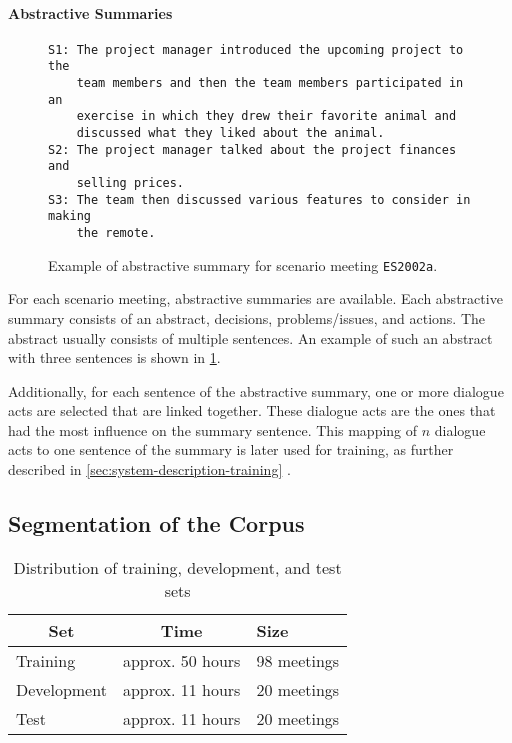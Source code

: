 \paragraph{Abstractive Summaries}

\begin{figure}[h]
\begin{lstlisting}[numbers=none]
S1: The project manager introduced the upcoming project to the 
    team members and then the team members participated in an
    exercise in which they drew their favorite animal and
    discussed what they liked about the animal.
S2: The project manager talked about the project finances and
    selling prices.
S3: The team then discussed various features to consider in making
    the remote.
\end{lstlisting}
\caption{Example of abstractive summary for scenario meeting \texttt{ES2002a}.}
\label{fig:abstractive-summary-example}
\end{figure}

For each scenario meeting, abstractive summaries are available.
Each abstractive summary consists of an abstract, decisions, problems/issues, and actions.
The abstract usually consists of multiple sentences.
An example of such an abstract with three sentences is shown in \cref{fig:abstractive-summary-example}.

Additionally, for each sentence of the abstractive summary, one or more dialogue acts are selected that are linked together.
These dialogue acts are the ones that had the most influence on the summary sentence.
This mapping of $n$ dialogue acts to one sentence of the summary is later used for training, as further described in \cref{sec:system-description-training} \cite{amiWebsite}.

\subsection{Segmentation of the Corpus}\label{ssec:ami-segmentation-of-the-corpus}

\begin{table}[h]
\centering
\begin{tabular}{@{}lll@{}}
\toprule
\multicolumn{1}{c}{\textbf{Set}} & \multicolumn{1}{c}{\textbf{Time}} & \textbf{Size} \\ \midrule
Training                         & approx. 50 hours                  & 98 meetings   \\
Development                      & approx. 11 hours                  & 20 meetings   \\
Test                             & approx. 11 hours                  & 20 meetings   \\ \bottomrule
\end{tabular}
\caption[Distribution of train, dev and test sets]{Distribution of training, development, and test sets \cite{amiWebsite}}
\label{tab:meeting-time-distribution}
\end{table}

